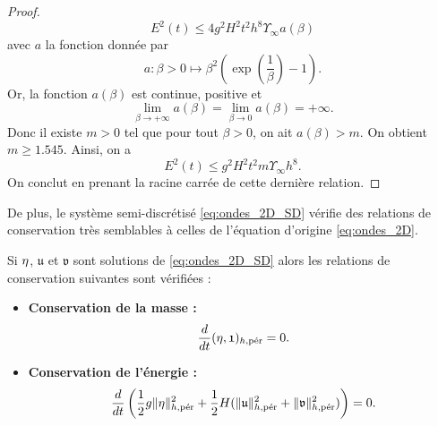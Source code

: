\begin{proof}
\begin{equation}
E^2(t) \leq 4 g^2 H^2 t^2 h^8 \Upsilon_{\infty} a(\beta)
\end{equation}
avec $a$ la fonction donnée par
\begin{equation}
a : \beta > 0 \mapsto \beta^2 \left( \exp \left(\dfrac{1}{\beta} \right) -1 \right).
\end{equation}
Or, la fonction $a(\beta)$ est continue, positive et
\begin{equation}
\lim_{\beta \rightarrow + \infty} a(\beta) = \lim_{\beta \rightarrow 0} a(\beta) = + \infty.
\end{equation}
Donc il existe $m>0$ tel que pour tout $\beta>0$, on ait $a(\beta)>m$. On obtient $m \geq 1.545$. Ainsi, on a
\begin{equation}
E^2(t) \leq g^2 H^2 t^2 m \Upsilon_{\infty} h^8.
\end{equation}
On conclut en prenant la racine carrée de cette dernière relation.
\end{proof}

De plus, le système semi-discrétisé \eqref{eq:ondes_2D_SD} vérifie des relations de conservation très semblables à celles de l'équation d'origine \eqref{eq:ondes_2D}.

\begin{proposition}
Si $\etafrak$, $\mathfrak{u}$ et $\mathfrak{v}$ sont solutions de \eqref{eq:ondes_2D_SD} alors les relations de conservation suivantes sont vérifiées :
\begin{itemize}
\item \textbf{Conservation de la masse :}
\begin{equation}
\dfrac{d}{dt} (\etafrak, \mathfrak{1})_{h,\per} = 0.
\end{equation}
\item \textbf{Conservation de l'énergie :}
\begin{equation}
\dfrac{d}{dt} \left( \dfrac{1}{2} g \| \etafrak \|_{h,\per}^2 + \dfrac{1}{2} H ( \| \mathfrak{u} \|_{h,\per}^2 +  \| \mathfrak{v} \|_{h,\per}^2) \right) = 0.
\end{equation}
\end{itemize}
\end{proposition}

